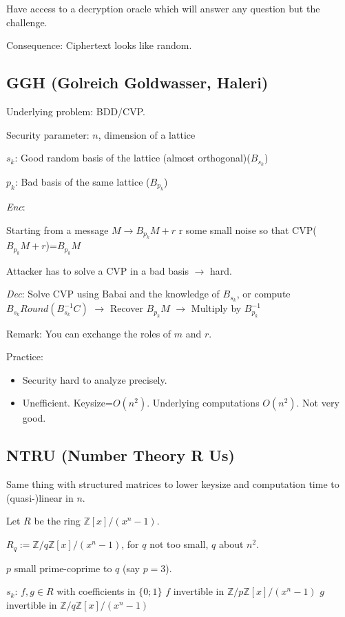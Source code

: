 \documentclass[11pt]{article}
\begin{document}
Have access to a decryption oracle which will answer any question but the challenge.

Consequence: Ciphertext looks like random.

\subsection{GGH (Golreich Goldwasser, Haleri)}

Underlying problem: BDD/CVP.

Security parameter: $n$, dimension of a lattice

$s_k$: Good random basis of the lattice (almost orthogonal)($B_{s_k}$)

$p_k$: Bad basis of the same lattice ($B_{p_k}$)

\textit{Enc}:

Starting from a message $M \rightarrow B_{p_k} M+r$ r some small noise so that CVP($B_{p_k} M+r$)=$B_{p_k} M$

Attacker has to solve a CVP in a bad basis $\rightarrow$ hard.

\textit{Dec}: Solve CVP using Babai and the knowledge of $B_{s_k}$, or compute $B_{s_k} Round(B_{s_k}^{-1} C)$
$\rightarrow$ Recover $B_{p_k} M$
$\rightarrow$ Multiply by $B_{p_k}^{-1}$

Remark: You can exchange the roles of $m$ and $r$.

Practice: 
\begin{itemize}
\item Security hard to analyze precisely.
\item Unefficient. Keysize=$O(n^2)$. Underlying computations $O(n^2)$. Not very good.
\end{itemize}

\subsection{NTRU (Number Theory R Us)}

Same thing with structured matrices to lower keysize and computation time to (quasi-)linear in $n$.

Let $R$ be the ring $\mathbb{Z}[x]/(x^n-1)$.

$R_q := \mathbb{Z}/q \mathbb{Z}[x]/(x^n-1)$, for $q$ not too small, $q$ about $n^2$.

$p$ small prime-coprime to $q$ (say $p=3$).

$s_k$: $f, g \in R$ with coefficients in $\{0;1\}$
$f$ invertible in $\mathbb{Z}/p \mathbb{Z}[x]/(x^n-1)$
$g$ invertible in $\mathbb{Z}/q \mathbb{Z}[x]/(x^n-1)$
\end{document}
